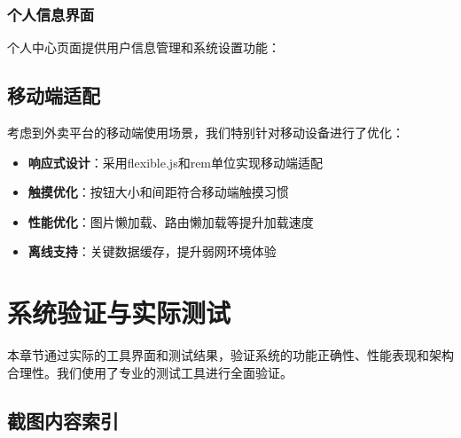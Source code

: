 \documentclass[a4paper,12pt]{article}
\begin{document}
\subsubsection{个人信息界面}

个人中心页面提供用户信息管理和系统设置功能：

\begin{figure}[H]
\centering
{}
\end{figure}

\subsection{移动端适配}

考虑到外卖平台的移动端使用场景，我们特别针对移动设备进行了优化：

\begin{itemize}
\item \textbf{响应式设计}：采用flexible.js和rem单位实现移动端适配
\item \textbf{触摸优化}：按钮大小和间距符合移动端触摸习惯
\item \textbf{性能优化}：图片懒加载、路由懒加载等提升加载速度
\item \textbf{离线支持}：关键数据缓存，提升弱网环境体验
\end{itemize}

\section{系统验证与实际测试}

本章节通过实际的工具界面和测试结果，验证系统的功能正确性、性能表现和架构合理性。我们使用了专业的测试工具进行全面验证。

\subsection{截图内容索引}
\end{document}
